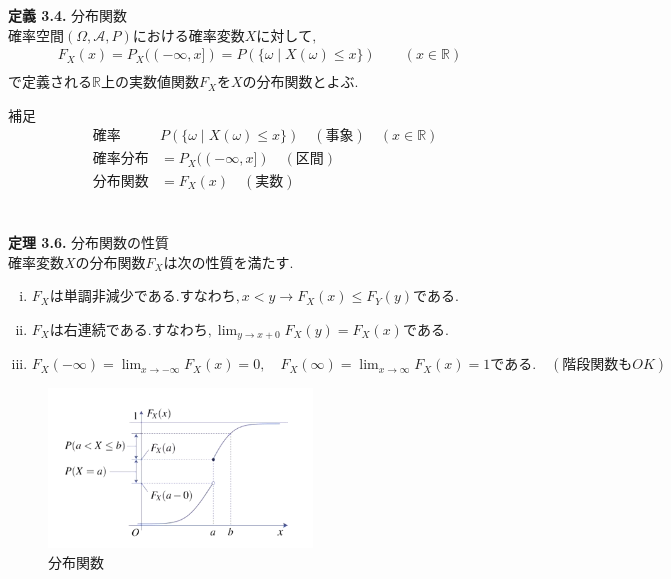 \documentclass[dvipdfmx,10pt, a4j]{jarticle}
\theoremstyle{definition}
\begin{document}
    \noindent
    \textbf{定義 3.4.} 分布関数\\
    $確率空間 (\Omega, \mathcal{A}, P) における確率変数 X に対して,$\\
    \begin{align*}
        F_X(x) = P_X((- \infty, x]) = P(\{ \omega \mid X(\omega) \leq x \}) \qquad (x \in \mathbb{R})\\
    \end{align*}
    $で定義される \mathbb{R} 上の実数値関数 F_X を X の \textbf{分布関数} とよぶ.$\\
    \begin{itembox}[l]{補足}
        \begin{align*}
            &確率 &P(\{ \omega \mid X(\omega) \leq x \}) \quad (事象) \quad (x \in \mathbb{R})\\
            &確率分布 &= P_X((- \infty, x]) \quad (区間)\\
            &分布関数 &= F_X(x) \quad (実数)\\
        \end{align*}
    \end{itembox}\\
    
    \noindent
    \textbf{定理 3.6.} 分布関数の性質\\
    $確率変数X の分布関数F_X は次の性質を満たす.$\\
    \begin{enumerate}[i)]
        \item $F_X は単調非減少である.すなわち, x < y \rightarrow F_X(x) \leq F_Y(y) である.$\\
        \item $F_X は右連続である. すなわち, \displaystyle \lim_{y \to x+0}F_X(y) = F_X(x)である.$\\
        \item $F_X (- \infty) = \displaystyle \lim_{x \to - \infty}F_X(x) = 0, \quad F_X(\infty) = \displaystyle \lim_{x \to \infty}F_X(x) = 1 である. \quad (階段関数もOK)$\\
    \end{enumerate}
    \begin{figure}[htbp]
        \begin{center}
            \includegraphics[width=7.0cm]{D_6/img_2.png}
            \caption{分布関数}
        \end{center}
    \end{figure}
    
\end{document}

